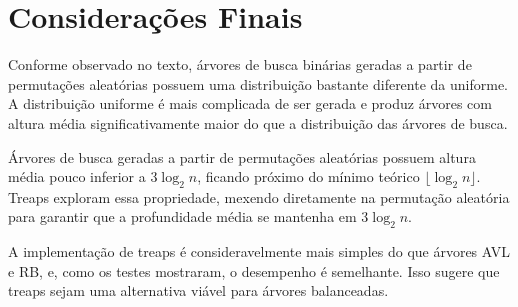 \section{Considerações Finais}

Conforme observado no texto,
árvores de busca binárias geradas a partir de permutações aleatórias
possuem uma distribuição bastante diferente da uniforme.
A distribuição uniforme é mais complicada de ser gerada
e produz árvores com altura média significativamente maior
do que a distribuição das árvores de busca.

Árvores de busca geradas a partir de permutações aleatórias
possuem altura média pouco inferior a $3\log_2 n$,
ficando próximo do mínimo teórico $\lfloor \log_2 n \rfloor$.
Treaps exploram essa propriedade,
mexendo diretamente na permutação aleatória
para garantir que a profundidade média se mantenha em $3 \log_2 n$.

A implementação de treaps é consideravelmente mais simples do que árvores AVL e RB,
e, como os testes mostraram,
o desempenho é semelhante.
Isso sugere que treaps sejam uma alternativa viável para árvores balanceadas.
